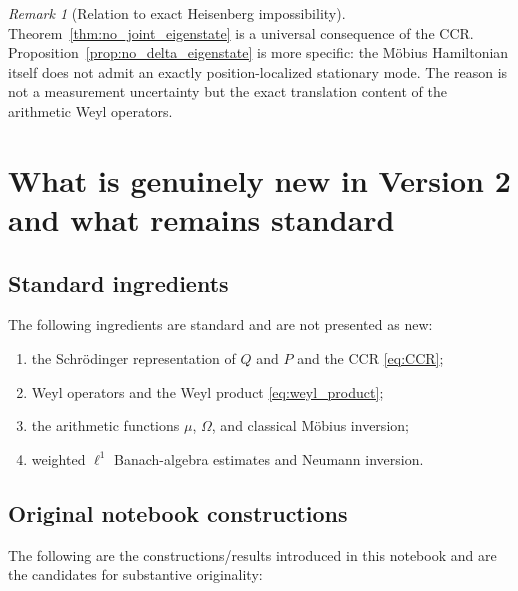 \documentclass[11pt]{amsart}
\numberwithin{equation}{section}
\theoremstyle{plain}
\theoremstyle{definition}
\theoremstyle{remark}
\newtheorem{remark}[theorem]{Remark}
\newcommand{\Om}{\Omega}
\begin{document}
\begin{remark}[Relation to exact Heisenberg impossibility]
\label{rem:nonlocalization_relation}
Theorem~\ref{thm:no_joint_eigenstate} is a universal consequence of the CCR.
Proposition~\ref{prop:no_delta_eigenstate} is more specific: the M\"obius
Hamiltonian itself does not admit an exactly position-localized stationary
mode.  The reason is not a measurement uncertainty but the exact translation
content of the arithmetic Weyl operators.
\end{remark}

\section{What is genuinely new in Version 2 and what remains standard}
\label{sec:status_classification}

\subsection{Standard ingredients}
\label{subsec:standard_ingredients}

The following ingredients are standard and are not presented as new:

\begin{enumerate}[leftmargin=*]
\item the Schr\"odinger representation of $Q$ and $P$ and the CCR
\eqref{eq:CCR};
\item Weyl operators and the Weyl product
\eqref{eq:weyl_product};
\item the arithmetic functions $\mu$, $\Om$, and classical M\"obius
inversion;
\item weighted $\ell^1$ Banach-algebra estimates and Neumann inversion.
\end{enumerate}

\subsection{Original notebook constructions}
\label{subsec:original_notebook_constructions}

The following are the constructions/results introduced in this notebook and
are the candidates for substantive originality:
\end{document}
